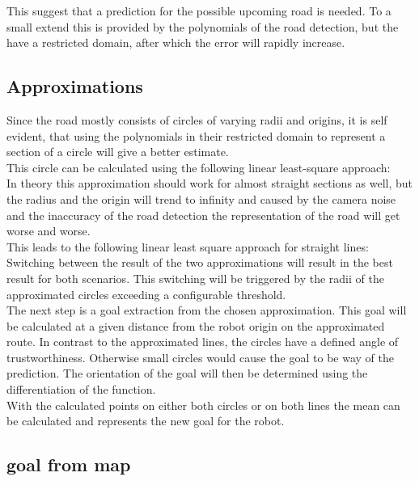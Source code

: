 This suggest that a prediction for the possible upcoming road is needed. To a small extend this is provided by the polynomials of the road detection, but the have a restricted domain, after which the error will rapidly increase.

\subsection{Approximations}

Since the road mostly consists of circles of varying radii and origins, it is self evident, that using the polynomials in their restricted domain to represent a section of a circle will give a better estimate.\\
This circle can be calculated using the following linear least-square approach:\\

In theory this approximation should work for almost straight sections as well, but the radius and the origin will trend to infinity and caused by the camera noise and the inaccuracy of the road detection the representation of the road will get worse and worse.\\

This leads to the following linear least square approach for straight lines:\\

Switching between the result of the two approximations will result in the best result for both scenarios. This switching will be triggered by the radii of the approximated circles exceeding a configurable threshold.\\

The next step is a goal extraction from the chosen approximation. This goal will be calculated at a given distance from the robot origin on the approximated route. In contrast to the approximated lines, the circles have a defined angle of trustworthiness. Otherwise small circles would cause the goal to be way of the prediction. The orientation of the goal will then be determined using the differentiation of the function.\\

With the calculated points on either both circles or on both lines the mean can be calculated and represents the new goal for the robot.



\subsection{goal from map}

